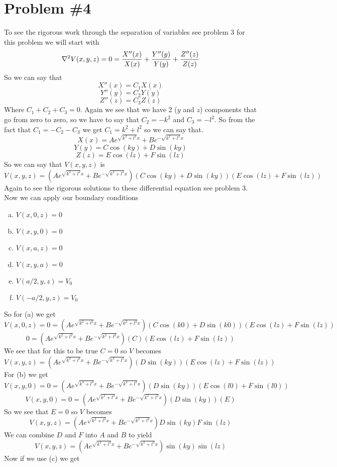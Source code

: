 \documentclass[11pt]{article}
\numberwithin{equation}{section}
\newcommand{\grad}{\bold\nabla}
\begin{document}
\section{Problem \#4}
To see the rigorous work through the separation of variables see problem 3 for this problem we will start with
$$\grad^2V(x,y,z) = 0 = \frac{X''(x)}{X(x)}+\frac{Y''(y)}{Y(y)}+\frac{Z''(z)}{Z(z)}$$
So we can say that
$${X''(x)}=C_1 {X(x)}$$
$${Y''(y)}=C_2{Y(y)}$$
$${Z''(z)}=C_3{Z(z)}$$
Where $C_1+C_2+C_3=0$. Again we see that we have 2 ($y$ and $z$) components that go from zero to zero, so we have to say that $C_2 = -k^2$ and $C_3 = -l^2$. So from the fact that $C_1 = -C_2-C_3$ we get $C_1= k^2+l^2$ so we can say that.
$$X(x) = Ae^{\sqrt{k^2+l^2}x}+Be^{-\sqrt{k^2+l^2}x}$$
$$Y(y) = C\cos(ky)+D\sin(ky)$$
$$Z(z) = E\cos(lz)+F\sin(lz)$$
So we can say that $V(x,y,z)$ is
$$V(x,y,z) = \left(Ae^{\sqrt{k^2+l^2}x}+Be^{-\sqrt{k^2+l^2}x}\right) \left(C\cos(ky)+D\sin(ky)\right) \left(E\cos(lz)+F\sin(lz)\right)$$
Again to see the rigorous solutions to these differential equation see problem 3. Now we can apply our boundary conditions
\begin{enumerate}[(a)]
\item $V(x,0,z) = 0$
\item $V(x,y,0) = 0$
\item $V(x,a,z) = 0$
\item $V(x,y,a) = 0$
\item $V(a/2,y,z) = V_0$
\item $V(-a/2,y,z) = V_0$
\end{enumerate}
So for (a) we get
$$V(x,0,z)=0= \left(Ae^{\sqrt{k^2+l^2}x}+Be^{-\sqrt{k^2+l^2}x}\right) \left(C\cos(k0)+D\sin(k0)\right) \left(E\cos(lz)+F\sin(lz)\right)$$
$$0= \left(Ae^{\sqrt{k^2+l^2}x}+Be^{-\sqrt{k^2+l^2}x}\right) \left(C\right) \left(E\cos(lz)+F\sin(lz)\right)$$
We see that for this to be true $C=0$ so $V$ becomes 
$$V(x,y,z) = \left(Ae^{\sqrt{k^2+l^2}x}+Be^{-\sqrt{k^2+l^2}x}\right) \left(D\sin(ky)\right) \left(E\cos(lz)+F\sin(lz)\right)$$
For (b) we get
$$V(x,y,0) = 0 = \left(Ae^{\sqrt{k^2+l^2}x}+Be^{-\sqrt{k^2+l^2}x}\right) \left(D\sin(ky)\right) \left(E\cos(l0)+F\sin(l0)\right)$$
$$V(x,y,0) = 0 = \left(Ae^{\sqrt{k^2+l^2}x}+Be^{-\sqrt{k^2+l^2}x}\right) \left(D\sin(ky)\right) \left(E\right)$$
So we see that $E=0$ so $V$ becomes
$$V(x,y,z) = \left(Ae^{\sqrt{k^2+l^2}x}+Be^{-\sqrt{k^2+l^2}x}\right)D\sin(ky)F\sin(lz)$$
We can combine $D$ and $F$ into $A$ and $B$ to yield
$$V(x,y,z) = \left(Ae^{\sqrt{k^2+l^2}x}+Be^{-\sqrt{k^2+l^2}x}\right)\sin(ky)\sin(lz)$$
Now if we use (c) we get 
\end{document}
